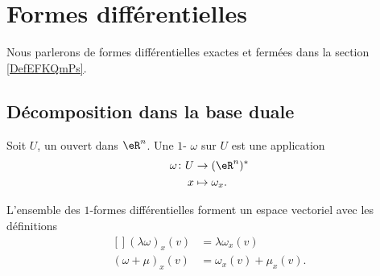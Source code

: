 
\section{Formes différentielles}
\label{SecFormDiffRappel}

Nous parlerons de formes différentielles exactes et fermées dans la section \ref{DefEFKQmPs}.

\subsection{Décomposition dans la base duale}

\begin{definition}      \label{DEFooMGXSooWioKie}
	Soit $U$, un ouvert dans $\eR^n$. Une $1$- $\omega$ sur $U$ est une application
	\begin{equation}
		\begin{aligned}
				\omega\colon U&\to (\eR^n)^* \\
				x&\mapsto \omega_x. 
			\end{aligned}
		\end{equation}
\end{definition}


\begin{remark}
	L'ensemble des $1$-formes différentielles forment un espace vectoriel avec les définitions
	\begin{equation}
		\begin{aligned}[]
			(\lambda\omega)_x(v)&=\lambda\omega_x(v)\\
			(\omega+\mu)_x(v)&=\omega_x(v)+\mu_x(v).
		\end{aligned}
	\end{equation}
\end{remark}

